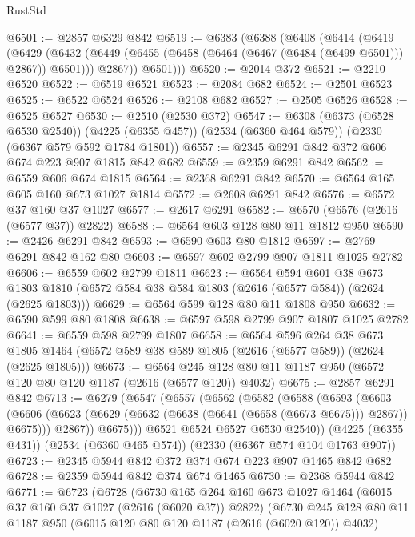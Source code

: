 \begin{lexlean}{RustStd}
\begin{coremodule}
@6501 := @2857 @6329 @842
@6519 := @6383
    (@6388
      (@6408
        (@6414
          (@6419
            (@6429
              (@6432 (@6449 (@6455 (@6458 (@6464 (@6467 (@6484 (@6499 @6501))) @2867)) @6501)))
              @2867))
          @6501)))
@6520 := @2014 @372
@6521 := @2210 @6520
@6522 := @6519 @6521
@6523 := @2084 @682
@6524 := @2501 @6523
@6525 := @6522 @6524
@6526 := @2108 @682
@6527 := @2505 @6526
@6528 := @6525 @6527
@6530 := @2510 (@2530 @372)
@6547 := @6308
    (@6373 (@6528 @6530 @2540))
    (@4225 (@6355 @457))
    (@2534 (@6360 @464 @579))
    (@2330 (@6367 @579 @592 @1784 @1801))
@6557 := @2345 @6291 @842 @372 @606 @674 @223 @907 @1815 @842 @682
@6559 := @2359 @6291 @842
@6562 := @6559 @606 @674 @1815
@6564 := @2368 @6291 @842
@6570 := @6564 @165 @605 @160 @673 @1027 @1814
@6572 := @2608 @6291 @842
@6576 := @6572 @37 @160 @37 @1027
@6577 := @2617 @6291
@6582 := @6570 (@6576 (@2616 (@6577 @37)) @2822)
@6588 := @6564 @603 @128 @80 @11 @1812 @950
@6590 := @2426 @6291 @842
@6593 := @6590 @603 @80 @1812
@6597 := @2769 @6291 @842 @162 @80
@6603 := @6597 @602 @2799 @907 @1811 @1025 @2782
@6606 := @6559 @602 @2799 @1811
@6623 := @6564
    @594
    @601
    @38
    @673
    @1803
    @1810
    (@6572 @584 @38 @584 @1803 (@2616 (@6577 @584)) (@2624 (@2625 @1803)))
@6629 := @6564 @599 @128 @80 @11 @1808 @950
@6632 := @6590 @599 @80 @1808
@6638 := @6597 @598 @2799 @907 @1807 @1025 @2782
@6641 := @6559 @598 @2799 @1807
@6658 := @6564
    @596
    @264
    @38
    @673
    @1805
    @1464
    (@6572 @589 @38 @589 @1805 (@2616 (@6577 @589)) (@2624 (@2625 @1805)))
@6673 := @6564 @245 @128 @80 @11 @1187 @950 (@6572 @120 @80 @120 @1187 (@2616 (@6577 @120)) @4032)
@6675 := @2857 @6291 @842
@6713 := @6279
    (@6547
      (@6557
        (@6562
          (@6582
            (@6588
              (@6593
                (@6603
                  (@6606 (@6623 (@6629 (@6632 (@6638 (@6641 (@6658 (@6673 @6675))) @2867)) @6675)))
                  @2867))
              @6675)))
        @6521
        @6524
        @6527
        @6530
        @2540))
    (@4225 (@6355 @431))
    (@2534 (@6360 @465 @574))
    (@2330 (@6367 @574 @104 @1763 @907))
@6723 := @2345 @5944 @842 @372 @374 @674 @223 @907 @1465 @842 @682
@6728 := @2359 @5944 @842 @374 @674 @1465
@6730 := @2368 @5944 @842
@6771 := @6723
    (@6728
      (@6730
        @165
        @264
        @160
        @673
        @1027
        @1464
        (@6015 @37 @160 @37 @1027 (@2616 (@6020 @37)) @2822)
        (@6730
          @245
          @128
          @80
          @11
          @1187
          @950
          (@6015 @120 @80 @120 @1187 (@2616 (@6020 @120)) @4032)

\end{coremodule}
\end{lexlean}
